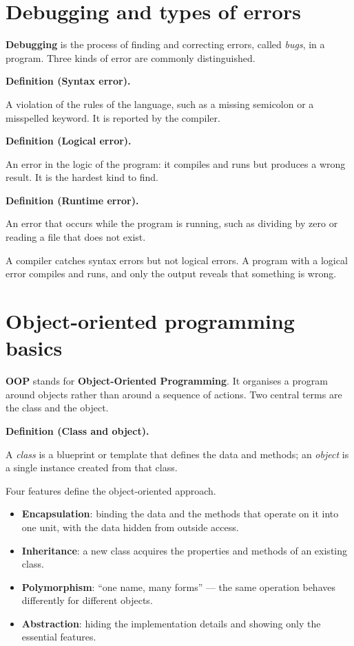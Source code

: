 \documentclass[11pt]{article}
\newenvironment{definitionbox}[1]{%
  \par\noindent\textbf{Definition (#1).}\ \itshape
}{\par\vspace{0.3em}}
\begin{document}
\section{Debugging and types of errors}
\textbf{Debugging} is the process of finding and correcting errors, called
\emph{bugs}, in a program. Three kinds of error are commonly distinguished.

\begin{definitionbox}{Syntax error}
A violation of the rules of the language, such as a missing semicolon or a
misspelled keyword. It is reported by the compiler.
\end{definitionbox}

\begin{definitionbox}{Logical error}
An error in the logic of the program: it compiles and runs but produces a
wrong result. It is the hardest kind to find.
\end{definitionbox}

\begin{definitionbox}{Runtime error}
An error that occurs while the program is running, such as dividing by zero
or reading a file that does not exist.
\end{definitionbox}

A compiler catches syntax errors but not logical errors. A program with a
logical error compiles and runs, and only the output reveals that something
is wrong.

\section{Object-oriented programming basics}
\textbf{OOP} stands for \textbf{Object-Oriented Programming}. It organises a
program around objects rather than around a sequence of actions. Two central
terms are the class and the object.

\begin{definitionbox}{Class and object}
A \emph{class} is a blueprint or template that defines the data and methods;
an \emph{object} is a single instance created from that class.
\end{definitionbox}

Four features define the object-oriented approach.

\begin{itemize}
  \item \textbf{Encapsulation}: binding the data and the methods that operate
    on it into one unit, with the data hidden from outside access.
  \item \textbf{Inheritance}: a new class acquires the properties and methods
    of an existing class.
  \item \textbf{Polymorphism}: ``one name, many forms'' --- the same operation
    behaves differently for different objects.
  \item \textbf{Abstraction}: hiding the implementation details and showing
    only the essential features.
\end{itemize}
\end{document}
